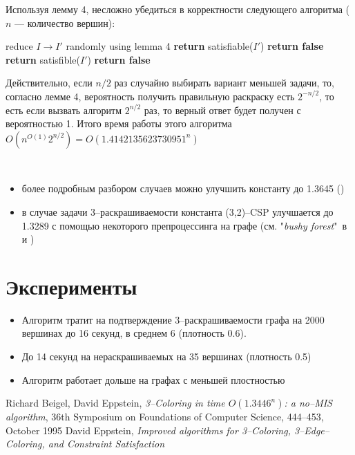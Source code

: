\documentclass[fleqn]{article}
\theoremstyle{plain}
\theoremstyle{plain}
\theoremstyle{plain}
\theoremstyle{definition}
\begin{document}
Используя лемму 4, несложно убедиться в корректности следующего алгоритма ($n$ --- количество вершин):
\begin{algorithm}[H]
  \begin{algorithmic}[1]
				\State reduce $I \rightarrow I'$ randomly using lemma 4
				\State \textbf{return} satisfiable($I'$)
				\State \textbf{return false}
			\Else
				\State \textbf{return} satisfible($I'$)
			\EndIf
    	\EndFor
    	\State \textbf{return false}
    \EndFunction
  \end{algorithmic}
\end{algorithm}

Действительно, если $n/2$ раз случайно выбирать вариант меньшей задачи, то, согласно лемме 4, вероятность получить правильную раскраску есть $2^{-n/2}$, то есть если вызвать алгоритм $2^{n/2}$ раз, то верный ответ будет получен с вероятностью 1. Итого время работы этого алгоритма $O(n^{O(1)}2^{n/2}) = O(1.4142135623730951^n)$


\

\begin{itemize}
	\item более подробным разбором случаев можно улучшить константу до 1.3645 (\cite{new})
	\item в случае задачи 3--раскрашиваемости константа (3,2)--CSP улучшается до 1.3289 с помощью некоторого препроцессинга на графе (см. "\emph{bushy forest}"\ в \cite{old} и \cite{new})
\end{itemize} 

\section{Эксперименты}
\begin{itemize}
	\item Алгоритм тратит на подтверждение 3--раскрашиваемости графа на 2000 вершинах до 16 секунд, в среднем 6 (плотность 0.6).
	\item До 14 секунд на нераскрашиваемых на 35 вершинах (плотность 0.5)
	\item Алгоритм работает дольше на графах с меньшей плостностью
\end{itemize}
\begin{thebibliography}{}
     Richard Beigel, David Eppstein, \emph{3--Coloring in time $O(1.3446^n)$: a no--MIS algorithm}, 36th Symposium on Foundations of Computer Science, 444--453, October 1995
     David Eppstein, \emph{Improved algorithms for 3--Coloring, 3--Edge--Coloring, and Constraint Satisfaction} 
\end{thebibliography}
\end{document}
